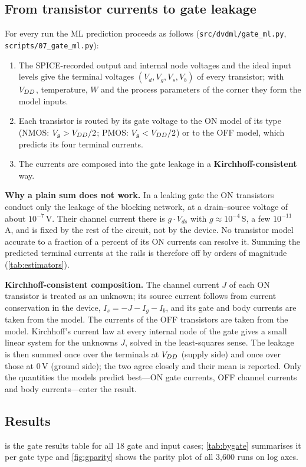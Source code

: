 \subsection{From transistor currents to gate leakage}\label{sec:gates_method}
For every run the ML prediction proceeds as follows (\texttt{src/dvdml/gate\_ml.py}, \texttt{scripts/07\_gate\_ml.py}):
\begin{enumerate}
  \item The SPICE-recorded output and internal node voltages and the ideal input levels give the terminal voltages $(V_d,V_g,V_s,V_b)$ of every
        transistor; with $V_{DD}$, temperature, $W$ and the process parameters of the corner they form the model inputs.
  \item Each transistor is routed by its gate voltage to the ON model of its type (NMOS: $V_g>V_{DD}/2$; PMOS: $V_g<V_{DD}/2$) or to the OFF model, which
        predicts its four terminal currents.
  \item The currents are composed into the gate leakage in a \textbf{Kirchhoff-consistent} way.
\end{enumerate}
\textbf{Why a plain sum does not work.} In a leaking gate the ON transistors conduct only the leakage of the blocking network, at a drain--source
voltage of about $10^{-7}$\,V. Their channel current there is $g\cdot V_{ds}$ with $g\approx10^{-4}$\,S, a few $10^{-11}$\,A, and is fixed by the rest
of the circuit, not by the device. No transistor model accurate to a fraction of a percent of its ON currents can resolve it. Summing the predicted
terminal currents at the rails is therefore off by orders of magnitude (\cref{tab:estimators}).

\textbf{Kirchhoff-consistent composition.} The channel current $J$ of each ON transistor is treated as an unknown; its source current follows from
current conservation in the device, $I_s=-J-I_g-I_b$, and its gate and body currents are taken from the model. The currents of the OFF transistors
are taken from the model. Kirchhoff's current law at every internal node of the gate gives a small linear system for the unknowns $J$, solved in the
least-squares sense. The leakage is then summed once over the terminals at $V_{DD}$ (supply side) and once over those at $0$\,V (ground side); the two
agree closely and their mean is reported. Only the quantities the models predict best---ON gate currents, OFF channel currents and body currents---enter
the result.


\subsection{Results}
 is the gate results table for all 18 gate and input cases; \cref{tab:bygate} summarises it per gate type and \cref{fig:gparity}
shows the parity plot of all 3{,}600 runs on log axes.




